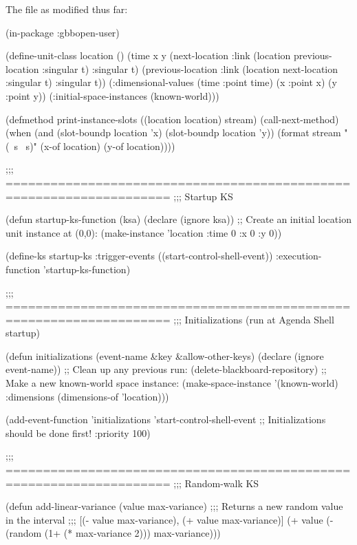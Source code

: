 \documentclass[10pt,twoside,english,pdftex]{article}
\begin{document}
\begin{tightitemize}
\item The  file as modified thus far:
%
\W\supp\notpretop
\begin{example}
  (in-package :gbbopen-user)

  (define-unit-class location ()
    (time 
     x y
     (next-location
      :link (location previous-location :singular t) 
      :singular t)
     (previous-location
      :link (location next-location :singular t)  
      :singular t))
    (:dimensional-values
      (time :point time)
      (x :point x)
      (y :point y))
    (:initial-space-instances (known-world)))

  (defmethod print-instance-slots ((location location) stream)
    (call-next-method)
    (when (and (slot-boundp location 'x)
               (slot-boundp location 'y))
      (format stream " (~s ~s)"
              (x-of location)
              (y-of location))))

  ;;; ====================================================================
  ;;;   Startup KS

  (defun startup-ks-function (ksa)
    (declare (ignore ksa))
    ;; Create an initial location unit instance at (0,0):
    (make-instance 'location :time 0 :x 0 :y 0))

  (define-ks startup-ks
      :trigger-events ((start-control-shell-event))
      :execution-function 'startup-ks-function)

  ;;; ====================================================================
  ;;;   Initializations (run at Agenda Shell startup)

  (defun initializations (event-name &key &allow-other-keys)
    (declare (ignore event-name))
    ;; Clean up any previous run:
    (delete-blackboard-repository)
    ;; Make a new known-world space instance:
    (make-space-instance 
     '(known-world)
     :dimensions (dimensions-of 'location)))

  (add-event-function 'initializations 'start-control-shell-event
                      ;; Initializations should be done first!
                      :priority 100)

  ;;; ====================================================================
  ;;;   Random-walk KS

  (defun add-linear-variance (value max-variance)
    ;;; Returns a new random value in the interval
    ;;; [(- value max-variance), (+ value max-variance)]
    (+ value (- (random (1+ (* max-variance 2))) max-variance)))


\end{example}
\end{tightitemize}
\end{document}

